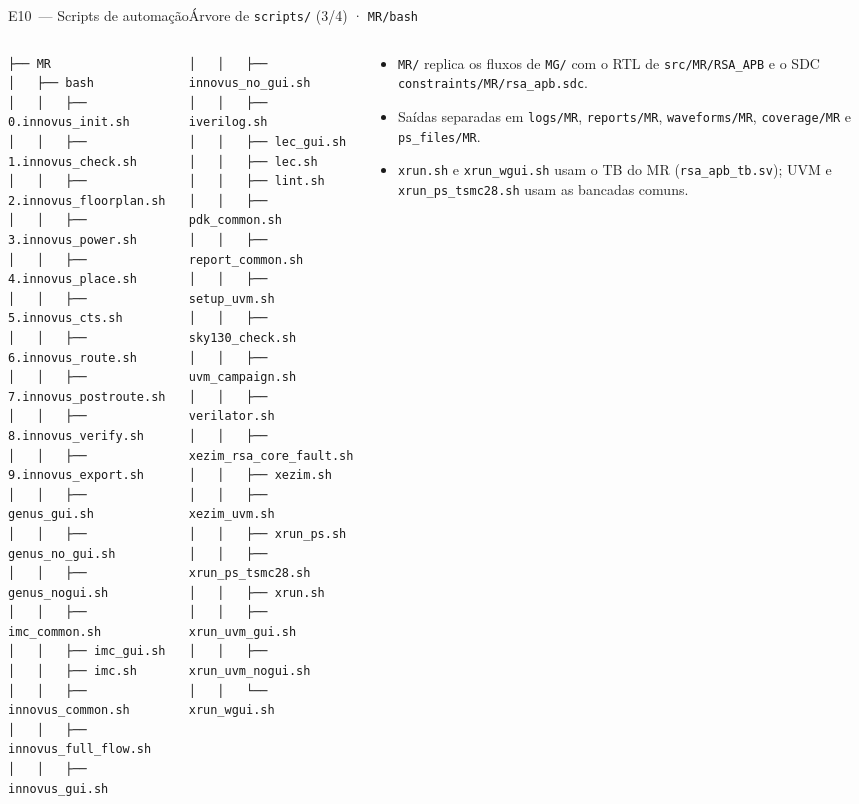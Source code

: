 \documentclass[aspectratio=169,10pt,t]{beamer}
\newcommand{\tmTree}{\fontsize{5.2}{6.1}\selectfont}
\begin{document}
\begin{frame}[fragile]{E10~— Scripts de automação}{Árvore de \texttt{scripts/} (3/4) · \texttt{MR/bash}}
  \vspace*{-0.3cm}
  \begin{columns}[T]
    \begin{column}{0.32\textwidth}
\tmTree
\begin{verbatim}
├── MR
│   ├── bash
│   │   ├── 0.innovus_init.sh
│   │   ├── 1.innovus_check.sh
│   │   ├── 2.innovus_floorplan.sh
│   │   ├── 3.innovus_power.sh
│   │   ├── 4.innovus_place.sh
│   │   ├── 5.innovus_cts.sh
│   │   ├── 6.innovus_route.sh
│   │   ├── 7.innovus_postroute.sh
│   │   ├── 8.innovus_verify.sh
│   │   ├── 9.innovus_export.sh
│   │   ├── genus_gui.sh
│   │   ├── genus_no_gui.sh
│   │   ├── genus_nogui.sh
│   │   ├── imc_common.sh
│   │   ├── imc_gui.sh
│   │   ├── imc.sh
│   │   ├── innovus_common.sh
│   │   ├── innovus_full_flow.sh
│   │   ├── innovus_gui.sh
\end{verbatim}
    \end{column}
    \begin{column}{0.32\textwidth}
\tmTree
\begin{verbatim}
│   │   ├── innovus_no_gui.sh
│   │   ├── iverilog.sh
│   │   ├── lec_gui.sh
│   │   ├── lec.sh
│   │   ├── lint.sh
│   │   ├── pdk_common.sh
│   │   ├── report_common.sh
│   │   ├── setup_uvm.sh
│   │   ├── sky130_check.sh
│   │   ├── uvm_campaign.sh
│   │   ├── verilator.sh
│   │   ├── xezim_rsa_core_fault.sh
│   │   ├── xezim.sh
│   │   ├── xezim_uvm.sh
│   │   ├── xrun_ps.sh
│   │   ├── xrun_ps_tsmc28.sh
│   │   ├── xrun.sh
│   │   ├── xrun_uvm_gui.sh
│   │   ├── xrun_uvm_nogui.sh
│   │   └── xrun_wgui.sh
\end{verbatim}
    \end{column}
    \begin{column}{0.32\textwidth}
      \vspace{0.2cm}
      \scriptsize
      \begin{itemize}
        \item \texttt{MR/} replica os fluxos de \texttt{MG/} com o RTL de \texttt{src/MR/RSA\_APB} e o SDC \texttt{constraints/MR/rsa\_apb.sdc}.
        \item Saídas separadas em \texttt{logs/MR}, \texttt{reports/MR}, \texttt{waveforms/MR}, \texttt{coverage/MR} e \texttt{ps\_files/MR}.
        \item \texttt{xrun.sh} e \texttt{xrun\_wgui.sh} usam o TB do MR (\texttt{rsa\_apb\_tb.sv}); UVM e \texttt{xrun\_ps\_tsmc28.sh} usam as bancadas comuns.
      \end{itemize}
    \end{column}
  \end{columns}
\end{frame}
\end{document}
